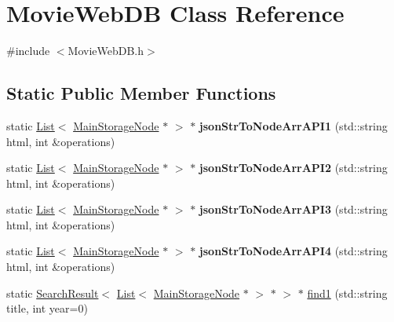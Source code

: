 \hypertarget{class_movie_web_d_b}{}\section{Movie\+Web\+DB Class Reference}
\label{class_movie_web_d_b}


{\ttfamily \#include $<$Movie\+Web\+D\+B.\+h$>$}

\subsection*{Static Public Member Functions}
\begin{DoxyCompactItemize}
\item 
\mbox{\label{class_movie_web_d_b_a3873d7d5c963d0403f75f7ec0290341a}} 
static \hyperlink{class_list}{List}$<$ \hyperlink{class_main_storage_node}{Main\+Storage\+Node} $\ast$ $>$ $\ast$ {\bfseries json\+Str\+To\+Node\+Arr\+A\+P\+I1} (std\+::string html, int \&operations)
\item 
\mbox{\label{class_movie_web_d_b_a74e35614191c08ea44ad496c1702d861}} 
static \hyperlink{class_list}{List}$<$ \hyperlink{class_main_storage_node}{Main\+Storage\+Node} $\ast$ $>$ $\ast$ {\bfseries json\+Str\+To\+Node\+Arr\+A\+P\+I2} (std\+::string html, int \&operations)
\item 
\mbox{\label{class_movie_web_d_b_aa94f44e8b192fa434bcb718208406c5c}} 
static \hyperlink{class_list}{List}$<$ \hyperlink{class_main_storage_node}{Main\+Storage\+Node} $\ast$ $>$ $\ast$ {\bfseries json\+Str\+To\+Node\+Arr\+A\+P\+I3} (std\+::string html, int \&operations)
\item 
\mbox{\label{class_movie_web_d_b_aabc73f63aeb918a09506c44c526a2b26}} 
static \hyperlink{class_list}{List}$<$ \hyperlink{class_main_storage_node}{Main\+Storage\+Node} $\ast$ $>$ $\ast$ {\bfseries json\+Str\+To\+Node\+Arr\+A\+P\+I4} (std\+::string html, int \&operations)
\item 
static \hyperlink{class_search_result}{Search\+Result}$<$ \hyperlink{class_list}{List}$<$ \hyperlink{class_main_storage_node}{Main\+Storage\+Node} $\ast$ $>$ $\ast$ $>$ $\ast$ \hyperlink{class_movie_web_d_b_a13c5f57385ee26b1f3750a09287c8f77}{find1} (std\+::string title, int year=0)
\item 

\end{DoxyCompactItemize}
